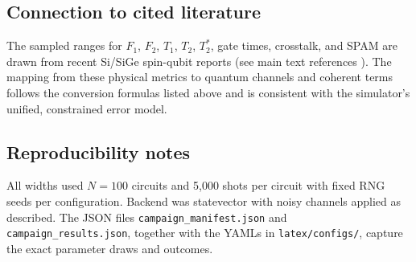 \subsection{Connection to cited literature}
The sampled ranges for $F_1$, $F_2$, $T_1$, $T_2$, $T_2^*$, gate times, crosstalk, and SPAM are drawn from recent Si/SiGe spin-qubit reports (see main text references \cite{ref1,ref2,ref4,ref5,ref6,ref9,ref10,ref11}). The mapping from these physical metrics to quantum channels and coherent terms follows the conversion formulas listed above and is consistent with the simulator's unified, constrained error model.

\subsection{Reproducibility notes}
All widths used $N=100$ circuits and 5,000 shots per circuit with fixed RNG seeds per configuration. Backend was statevector with noisy channels applied as described. The JSON files \texttt{campaign\_manifest.json} and \texttt{campaign\_results.json}, together with the YAMLs in \texttt{latex/configs/}, capture the exact parameter draws and outcomes.
